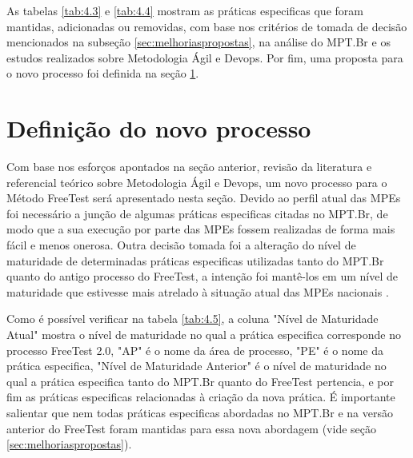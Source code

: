 As tabelas \ref{tab:4.3} e \ref{tab:4.4} mostram as práticas especificas que foram mantidas, adicionadas ou removidas, com base nos critérios de tomada de decisão mencionados na subseção \ref{sec:melhoriaspropostas}, na análise do MPT.Br e os estudos realizados sobre Metodologia Ágil e Devops. Por fim, uma proposta para o novo processo foi definida na seção \ref{sec:novoprocesso}.

\section{Definição do novo processo}
\label{sec:novoprocesso}

Com base nos esforços apontados na seção anterior, revisão da literatura e referencial teórico sobre Metodologia Ágil e Devops, um novo processo para o Método FreeTest será apresentado nesta seção. Devido ao perfil atual das MPEs foi necessário a junção de algumas práticas especificas citadas no MPT.Br, de modo que a sua execução por parte das MPEs fossem realizadas de forma mais fácil e menos onerosa. Outra decisão tomada foi a alteração do nível de maturidade de determinadas práticas especificas utilizadas tanto do MPT.Br quanto do antigo processo do FreeTest, a intenção foi mantê-los em um nível de maturidade que estivesse mais atrelado à situação atual das MPEs nacionais \cite{Especialistas2015, SilvaDias2015}.

Como é possível verificar na tabela \ref{tab:4.5}, a coluna "Nível de Maturidade Atual" mostra o nível de maturidade no qual a prática especifica corresponde no processo FreeTest 2.0, "AP" é o nome da área de processo, "PE" é o nome da prática especifica, "Nível de Maturidade Anterior" é o nível de maturidade no qual a prática especifica tanto do MPT.Br quanto do FreeTest pertencia, e por fim as práticas especificas relacionadas à criação da nova prática. É importante salientar que nem todas práticas especificas abordadas no MPT.Br e na versão anterior do FreeTest foram mantidas para essa nova abordagem (vide seção \ref{sec:melhoriaspropostas}).

